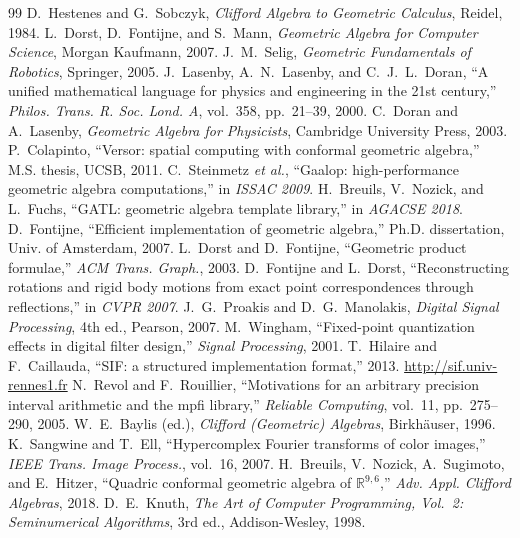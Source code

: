 \documentclass[11pt,a4paper]{article}
\theoremstyle{definition}
\theoremstyle{plain}
\theoremstyle{remark}
\begin{document}
\begin{thebibliography}{99}
 D.~Hestenes and G.~Sobczyk, \emph{Clifford Algebra to Geometric Calculus}, Reidel, 1984.
 L.~Dorst, D.~Fontijne, and S.~Mann, \emph{Geometric Algebra for Computer Science}, Morgan Kaufmann, 2007.
 J.~M.~Selig, \emph{Geometric Fundamentals of Robotics}, Springer, 2005.
 J.~Lasenby, A.~N.~Lasenby, and C.~J.~L.~Doran, ``A unified mathematical language for physics and engineering in the 21st century,'' \emph{Philos. Trans. R. Soc. Lond. A}, vol.~358, pp.~21--39, 2000.
 C.~Doran and A.~Lasenby, \emph{Geometric Algebra for Physicists}, Cambridge University Press, 2003.
 P.~Colapinto, ``Versor: spatial computing with conformal geometric algebra,'' M.S. thesis, UCSB, 2011.
 C.~Steinmetz \emph{et al.}, ``Gaalop: high-performance geometric algebra computations,'' in \emph{ISSAC 2009}.
 H.~Breuils, V.~Nozick, and L.~Fuchs, ``GATL: geometric algebra template library,'' in \emph{AGACSE 2018}.
 D.~Fontijne, ``Efficient implementation of geometric algebra,'' Ph.D. dissertation, Univ. of Amsterdam, 2007.
 L.~Dorst and D.~Fontijne, ``Geometric product formulae,'' \emph{ACM Trans. Graph.}, 2003.
 D.~Fontijne and L.~Dorst, ``Reconstructing rotations and rigid body motions from exact point correspondences through reflections,'' in \emph{CVPR 2007}.
 J.~G.~Proakis and D.~G.~Manolakis, \emph{Digital Signal Processing}, 4th ed., Pearson, 2007.
 M.~Wingham, ``Fixed-point quantization effects in digital filter design,'' \emph{Signal Processing}, 2001.
 T.~Hilaire and F.~Caillauda, ``SIF: a structured implementation format,'' 2013. \url{http://sif.univ-rennes1.fr}
 N.~Revol and F.~Rouillier, ``Motivations for an arbitrary precision interval arithmetic and the mpfi library,'' \emph{Reliable Computing}, vol.~11, pp.~275--290, 2005.
 W.~E.~Baylis (ed.), \emph{Clifford (Geometric) Algebras}, Birkh\"auser, 1996.
 K.~Sangwine and T.~Ell, ``Hypercomplex Fourier transforms of color images,'' \emph{IEEE Trans. Image Process.}, vol.~16, 2007.
 H.~Breuils, V.~Nozick, A.~Sugimoto, and E.~Hitzer, ``Quadric conformal geometric algebra of $\mathbb{R}^{9,6}$,'' \emph{Adv. Appl. Clifford Algebras}, 2018.
 D.~E.~Knuth, \emph{The Art of Computer Programming, Vol.~2: Seminumerical Algorithms}, 3rd ed., Addison-Wesley, 1998.

\end{thebibliography}
\end{document}
